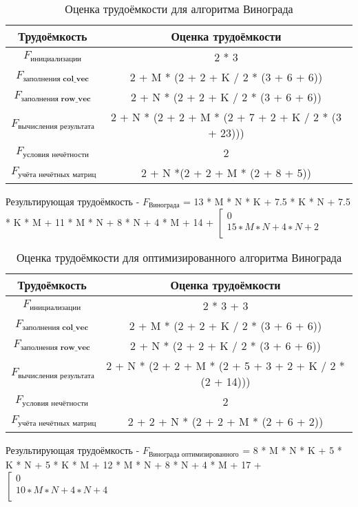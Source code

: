 \begin{table}[h!]
  \begin{center}
    \captionsetup{justification=raggedright}
    \caption{Оценка трудоёмкости для алгоритма Винограда}
    \label{tab:workcost_classic}
    \begin{tabular}{c|c}
      \textbf{Трудоёмкость} & \textbf{Оценка трудоёмкости}\\
      \hline
	$F_{\textbf{инициализации}}$ & 2 * 3\\
	$F_{\textbf{заполнения col\_vec}}$ & 2 + M * (2 + 2 + K / 2 * (3 + 6 + 6))\\
	$F_{\textbf{заполнения row\_vec}}$ & 2 + N * (2 + 2 + K / 2 * (3 + 6 + 6))\\
	$F_{\textbf{вычисления результата}}$ & 2 + N * (2 + 2 + M * (2 + 7 + 2 + K / 2 * (3 + 23)))\\
	$F_{\textbf{условия нечётности}}$ & 2\\
	$F_{\textbf{учёта нечётных матриц}}$ & 2 + N *(2 + 2 + M * (2 + 8 + 5))
    \end{tabular}
  \end{center}
\end{table}
Результирующая трудоёмкость - $F_{\text{Винограда}}$ = 13 * M * N * K + 7.5 * K * N + 7.5 * K * M + 11 * M * N + 8 * N + 4 * M + 14 + 
$\left[ 
  \begin{array}{c}
    0 \\
    15 ∗ M ∗ N + 4 ∗ N + 2 \\
  \end{array}
\right.$


\begin{table}[h!]
  \begin{center}
    \captionsetup{justification=raggedright}
    \caption{Оценка трудоёмкости для оптимизированного алгоритма Винограда}
    \label{tab:workcost_classic}
    \begin{tabular}{c|c}
      \textbf{Трудоёмкость} & \textbf{Оценка трудоёмкости}\\
      \hline
	$F_{\textbf{инициализации}}$ & 2 * 3 + 3\\
	$F_{\textbf{заполнения col\_vec}}$ & 2 + M * (2 + 2 + K / 2 * (3 + 6 + 6))\\
	$F_{\textbf{заполнения row\_vec}}$ & 2 + N * (2 + 2 + K / 2 * (3 + 6 + 6))\\
	$F_{\textbf{вычисления результата}}$ &2 + N * (2 + 2 + M * (2 + 5 + 3 + 2 + K / 2 * (2 + 14)))\\
	$F_{\textbf{условия нечётности}}$ & 2\\
	$F_{\textbf{учёта нечётных матриц}}$ & 2 + 2 + N * (2 + 2 + M * (2 + 6 + 2))
    \end{tabular}
  \end{center}
\end{table}
Результирующая трудоёмкость - $F_{\text{Винограда оптимизированного}}$ = 8 * M * N * K + 5 * K * N + 5 * K * M + 12 * M * N
+ 8 * N + 4 * M + 17 +
$\left[ 
  \begin{array}{c}
    0 \\
    10 ∗ M ∗ N + 4 ∗ N + 4 \\
  \end{array}
\right.$

